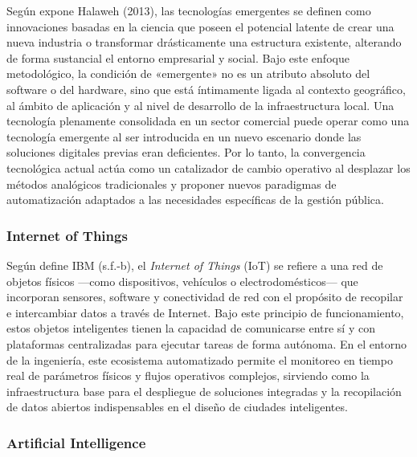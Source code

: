 \documentclass[12pt,a4paper]{article}
\begin{document}
Según expone Halaweh (2013), las tecnologías emergentes se definen como innovaciones basadas en la ciencia que poseen el potencial latente de crear una nueva industria o transformar drásticamente una estructura existente, alterando de forma sustancial el entorno empresarial y social. Bajo este enfoque metodológico, la condición de «emergente» no es un atributo absoluto del software o del hardware, sino que está íntimamente ligada al contexto geográfico, al ámbito de aplicación y al nivel de desarrollo de la infraestructura local. Una tecnología plenamente consolidada en un sector comercial puede operar como una tecnología emergente al ser introducida en un nuevo escenario donde las soluciones digitales previas eran deficientes. Por lo tanto, la convergencia tecnológica actual actúa como un catalizador de cambio operativo al desplazar los métodos analógicos tradicionales y proponer nuevos paradigmas de automatización adaptados a las necesidades específicas de la gestión pública.

\subsubsection{Internet of Things}

Según define IBM (s.f.-b), el \textit{Internet of Things} (IoT) se refiere a una red de objetos físicos —como dispositivos, vehículos o electrodomésticos— que incorporan sensores, software y conectividad de red con el propósito de recopilar e intercambiar datos a través de Internet. Bajo este principio de funcionamiento, estos objetos inteligentes tienen la capacidad de comunicarse entre sí y con plataformas centralizadas para ejecutar tareas de forma autónoma. En el entorno de la ingeniería, este ecosistema automatizado permite el monitoreo en tiempo real de parámetros físicos y flujos operativos complejos, sirviendo como la infraestructura base para el despliegue de soluciones integradas y la recopilación de datos abiertos indispensables en el diseño de ciudades inteligentes.

\subsubsection{Artificial Intelligence}
\end{document}
